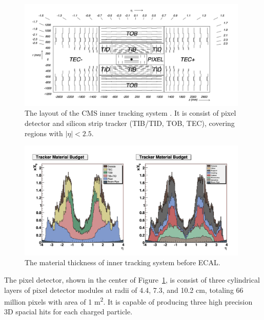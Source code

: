 \begin{figure}[ht]
    \centering
    \includegraphics[width=0.98\textwidth]{chapters/CMSExperiment/sectionDetector/figures/tracker.png}
    \caption{The layout of the CMS inner tracking system \cite{exhep:cms:Chatrchyan:2008aa}. It is consist of pixel detector and silicon strip tracker (TIB/TID, TOB, TEC), covering regions with $|\eta|<2.5$. }
    \label{fig:cmsexperiment:detector:tracker}
\end{figure}


\begin{figure}[ht]
    \centering
    \includegraphics[width=0.98\textwidth]{chapters/CMSExperiment/sectionDetector/figures/trackerMaterial.png}
    \caption{The material thickness of inner tracking system before ECAL.}
    \label{fig:cmsexperiment:detector:trackerMaterial}
\end{figure}


The pixel detector, shown in the center of Figure~\ref{fig:cmsexperiment:detector:tracker}, is consist of three cylindrical layers of pixel detector modules at radii of 4.4, 7.3, and 10.2 cm, totaling 66 million pixels with area of 1 \si{\m \squared}. It is capable of producing three high precision 3D spacial hits for each charged particle. 

